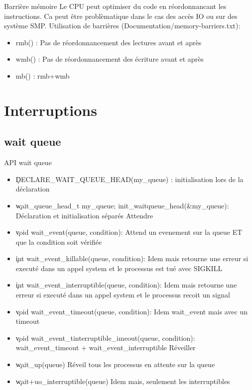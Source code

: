 \begin{frame}{Barrière mémoire}
  Le CPU peut optimiser du code en réordonnancant les instructions. Ca
  peut être problèmatique dans le cas  des accès IO ou sur des système
  SMP. Utilisation de barrières (Documentation/memory-barriers.txt):
\begin{itemize}
\item rmb() : Pas de réordonnancement des lectures avant et après
\item wmb() : Pas de réordonnancement des écriture avant et après
\item mb() : rmb+wmb
\end{itemize} 
\end{frame} 


\section{Interruptions}

\subsection{wait queue}

\begin{frame}{API wait queue}
  \begin{itemize} 
Declarer:
  \item \c{DECLARE_WAIT_QUEUE_HEAD(my_queue)} : initialisation lors de la déclaration
  \item \c{wait_queue_head_t my_queue; init_waitqueue_head(&my_queue)}: Déclaration et initialisation séparés
Attendre
  \item \c{void wait_event(queue, condition)}: Attend un evenement sur la queue ET que la condition soit vérifiée
  \item \c{int wait_event_killable(queue, condition)}: Idem mais retourne une erreur si executé dans un appel system et le processus est tué avec SIGKILL
  \item \c{int wait_event_interruptible(queue, condition)}: Idem mais retourne une erreur si executé dans un appel system et le processus recoit un signal
  \item \c{void wait_event_timeout(queue, condition)}: Idem wait_event mais avec un timeout
  \item \c{void wait_event_tinterruptible_imeout(queue, condition)}: wait_event_timeout + wait_event_interruptible
Réveiller
\item \c{wait_up(queue)} Réveil tous les processus en attente sur la queue
\item \c{wait+uo_interruptible(queue)} Idem mais, seulement les interruptibles
  \end{itemize} 
\end{frame} 


